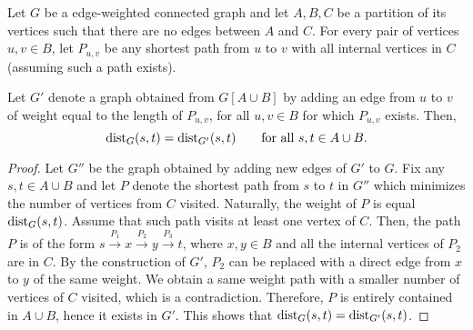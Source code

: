 \begin{lemma}\label{l:inserting_paths}
Let $G$ be a edge-weighted connected graph and let $A, B, C$ be a partition of its vertices such that there are no edges between $A$ and $C$. For every pair of vertices $u, v \in B$, let $P_{u, v}$ be any shortest path from $u$ to $v$ with all internal vertices in $C$ (assuming such a path exists).

Let $G'$ denote a graph obtained from $G[A \cup B]$ by adding an edge from $u$ to $v$ of weight equal to the length of $P_{u, v}$, for all $u, v \in B$ for which $P_{u, v}$ exists. Then,  $$\mathrm{dist}_G(s, t) = \mathrm{dist}_{G'}(s, t)\qquad\textrm{for all }s,t\in A\cup B.$$
\end{lemma}
\begin{proof}
Let $G''$ be the graph obtained by adding new edges of $G'$ to $G$.
Fix any $s, t \in A \cup B$ and let $P$ denote the shortest path from $s$ to $t$ in $G''$ which minimizes the number of vertices from $C$ visited. Naturally, the weight of $P$ is equal $\mathrm{dist}_G(s, t)$. Assume that such path visits at least one vertex of $C$. Then, the path $P$ is of the form $s \xrightarrow{P_1} x \xrightarrow{P_2} y \xrightarrow{P_3} t$, where $x, y \in B$ and all the internal vertices of $P_2$ are in $C$. By the construction of $G'$, $P_2$ can be replaced with a direct edge from $x$ to $y$ of the same weight. We obtain a same weight path with a smaller number of vertices of $C$ visited, which is a contradiction. Therefore, $P$ is entirely contained in $A \cup B$, hence it exists in $G'$. This shows that $\mathrm{dist}_G(s, t) = \mathrm{dist}_{G'}(s, t)$.
\end{proof}


